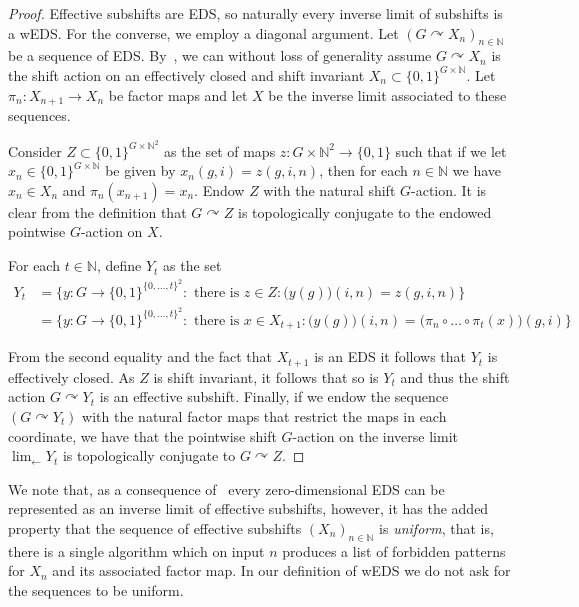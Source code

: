 \documentclass{article}
\theoremstyle{definition}
\theoremstyle{plain}
\newcommand{\NN}{\mathbb{N}}
\newcommand{\define}[1]{\textit{#1}}
\begin{document}
\begin{proof}
    Effective subshifts are EDS, so naturally every inverse limit of subshifts is a wEDS. For the converse, we employ a diagonal argument. Let $(G\curvearrowright X_n)_{n \in \NN}$ be a sequence of EDS. By~, we can without loss of generality assume $G\curvearrowright X_n$ is the shift action on an effectively closed and shift invariant $X_n \subset \{0,1\}^{G\times \NN}$. Let $\pi_{n}\colon X_{n+1} \to X_{n}$ be factor maps and let $X$ be the inverse limit associated to these sequences. 

    Consider $Z \subset \{0,1\}^{G\times \NN^2}$ as the set of maps $z\colon G\times \NN^2\to \{0,1\}$ such that if we let $x_n \in \{0,1\}^{G\times \NN}$ be given by $x_n(g,i) =z(g,i,n)$, then for each $n \in \NN$ we have $x_n \in X_n$ and $\pi_n(x_{n+1})=x_n$. Endow $Z$ with the natural shift $G$-action. It is clear from the definition that $G\curvearrowright Z$ is topologically conjugate to the endowed pointwise $G$-action on $X$.
    
    For each $t \in \NN$, define $Y_t$ as the set \begin{align*}
        Y_t & = \{ y \colon G \to \{0,1\}^{\{0,\dots,t\}^2} : \mbox{ there is } z \in Z: \bigl(y(g)\bigr)(i,n) = z(g,i,n)\}\\
        & = \{ y \colon G \to \{0,1\}^{\{0,\dots,t\}^2} : \mbox{ there is } x \in X_{t+1}: \bigl(y(g)\bigr)(i,n) = \bigl(\pi_n \circ \dots \circ \pi_{t}(x)\bigr)(g,i)\}
    \end{align*}   

    From the second equality and the fact that $X_{t+1}$ is an EDS it follows that $Y_t$ is effectively closed. As $Z$ is shift invariant, it follows that so is $Y_t$ and thus the shift action $G\curvearrowright Y_t$ is an effective subshift. Finally, if we endow the sequence $(G\curvearrowright Y_t)$ with the natural factor maps that restrict the maps in each coordinate, we have that the pointwise shift $G$-action on the inverse limit $\lim_{\leftarrow} Y_t$ is topologically conjugate to $G\curvearrowright Z$.\end{proof}


We note that, as a consequence of~ every zero-dimensional EDS can be represented as an inverse limit of effective subshifts, however, it has the added property that the sequence of effective subshifts $(X_n)_{n \in \NN}$ is \define{uniform}, that is, there is a single algorithm which on input $n$ produces a list of forbidden patterns for $X_n$ and its associated factor map. In our definition of wEDS we do not ask for the sequences to be uniform.
\end{document}
